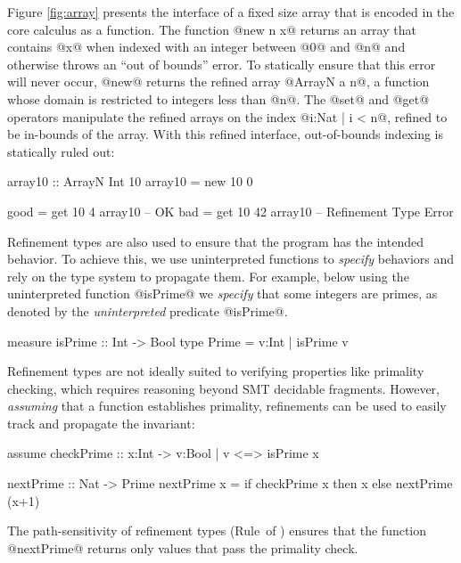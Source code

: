 Figure \ref{fig:array} presents the interface of a fixed size array
that is encoded in the core calculus \sysrf as a function.
%
The function @new n x@ returns an array that contains
@x@ when indexed with an integer between @0@ and @n@
and otherwise throws an ``out of bounds'' error.
To statically ensure that this error will never occur,
@new@ returns the refined array @ArrayN a n@, \ie
a function whose domain is restricted to integers less than @n@.
%
The @set@ and @get@ operators manipulate the refined arrays
on the index @i:{Nat | i < n}@, \ie refined to be in-bounds of the array.
%
With this refined interface, out-of-bounds indexing is statically ruled out:
\begin{code}
  array10 :: ArrayN Int 10
  array10 = new 10 0

  good = get 10 4  array10 -- OK
  bad  = get 10 42 array10 -- Refinement Type Error
\end{code}

\label{sec:overview:primes}
%
Refinement types are also used to ensure that the program has the intended behavior.
To achieve this, we use uninterpreted functions to \textit{specify} behaviors
and rely on the type system to propagate them.
For example, below using the uninterpreted function @isPrime@ we \textit{specify}
that some integers are primes, as denoted by the \emph{uninterpreted} predicate @isPrime@.
%
\begin{code}
  measure isPrime :: Int -> Bool
  type Prime = {v:Int | isPrime v}
\end{code}
%
Refinement types are not ideally suited to verifying properties
like primality checking, which requires reasoning beyond SMT
decidable fragments.
%
However, \emph{assuming} that a function establishes primality,
refinements can be used to easily track and propagate the invariant:
%
\begin{code}
  assume checkPrime :: x:Int -> {v:Bool | v <=> isPrime x}

  nextPrime :: Nat -> Prime
  nextPrime x = if checkPrime x then x else nextPrime (x+1)
\end{code}
%
The path-sensitivity of refinement types (Rule~\tIf of )
ensures that the function @nextPrime@ returns only
values that pass the primality check.

